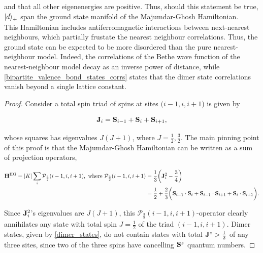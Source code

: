 \documentclass{homework}
\begin{document}
and that all other eigenenergies are positive. Thus, should this statement be true, $\ket{d}_{\pm}$ span the ground state manifold of the Majumdar-Ghosh Hamiltonian. \\

This Hamiltonian includes antiferromagnetic interactions between next-nearest neighbours, which partially frustate the nearest neighbour correlations. Thus, the ground state can be expected to be more disordered than the pure nearest-neighbour model. Indeed, the correlations of the Bethe wave function of the nearest-neighbour model decay as an inverse power of distance, while  \cref{bipartite_valence_bond_states_corrs} states that the dimer state correlations vanish beyond a single lattice constant. 

\begin{proof}

Consider a total spin triad of spins at sites $(i-1, i, i+1$) is given by 

\begin{equation}
    {\bf J}_i = {\bf S}_{i-1} + {\bf S}_i + {\bf S}_{i+1},
\end{equation}

whose squares has eigenvalues $J(J+1)$, where $J = \frac{1}{2}, \frac{3}{2}$. The main pinning point of this proof is that the Majumdar-Ghosh Hamiltonian can be written as a sum of projection operators,

\begin{equation}\begin{split}
    {\bf H}^{\textnormal{HG}} = |K| \sum_{i} \mathcal{P}_{\frac{3}{2}}(i-1,i,i+1), \textnormal{ where } 
        \mathcal{P}_{\frac{3}{2}}(i-1,i,i+1) &= \frac{1}{3} \bigg({\bf J}_i^2 - \frac{3}{4}\bigg) \\
        &= \frac{1}{2} + \frac{2}{3} \bigg({\bf S}_{i-1} \cdot {\bf S}_i + {\bf S}_{i - 1} \cdot {\bf S}_{i+1} + {\bf S}_{i} \cdot {\bf S}_{i+1} \bigg). 
    \end{split}
\end{equation}

Since ${\bf J}_i^2$'s eigenvalues are $J(J+1)$, this $\mathcal{P}_{\frac{3}{2}}(i-1,i,i+1)$-operator clearly annihilates any state with total spin $J = \frac{1}{2}$ of the triad $(i-1, i, i+1)$. Dimer states, given by \cref{dimer_states}, do not contain states with total ${\bf J}^z > \frac{1}{2}$ of any three sites, since two of the three spins have cancelling ${{\bf S}}^z$ quantum numbers.


\end{proof}
\end{document}
